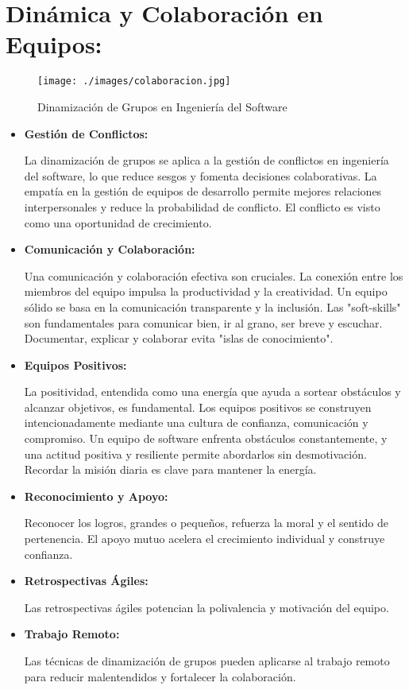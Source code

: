 \documentclass[a4paper,12pt,twoside]{article}
\begin{document}
 

\section{Dinámica y Colaboración en Equipos:}

\begin{figure}[H]
    \centering
    \texttt{[image: ./images/colaboracion.jpg]}
    \caption{Dinamización de Grupos en Ingeniería del Software}
    \label{fig:dinamizacion}
\end{figure}

\begin{itemize}
    \item \textbf{Gestión de Conflictos:} 
    
    La dinamización de grupos se aplica a la gestión de 
    conflictos en ingeniería del software, lo que reduce sesgos y fomenta decisiones colaborativas. 
    La empatía en la gestión de equipos de desarrollo permite mejores relaciones interpersonales y 
    reduce la probabilidad de conflicto. El conflicto es visto como una oportunidad de crecimiento.

    \item \textbf{Comunicación y Colaboración:} 
    
    Una comunicación y colaboración efectiva son 
    cruciales. La conexión entre los miembros del equipo impulsa la productividad y la creatividad.
    Un equipo sólido se basa en la comunicación transparente y la inclusión. Las "soft-skills" son fundamentales para comunicar bien, ir al grano, ser breve y escuchar. Documentar, explicar y colaborar evita "islas de conocimiento".

    \item \textbf{Equipos Positivos:} 
    
    La positividad, entendida como una energía que ayuda a sortear obstáculos y alcanzar objetivos, 
    es fundamental. Los equipos positivos se construyen intencionadamente mediante una cultura de 
    confianza, comunicación y compromiso. Un equipo de software enfrenta obstáculos constantemente, 
    y una actitud positiva y resiliente permite abordarlos sin desmotivación. Recordar la misión 
    diaria es clave para mantener la energía.

    \item \textbf{Reconocimiento y Apoyo:} 
    
    Reconocer los logros, grandes o pequeños, refuerza la 
    moral y el sentido de pertenencia. El apoyo mutuo acelera el crecimiento individual y construye 
    confianza.

    \item \textbf{Retrospectivas Ágiles:} 
    
    Las retrospectivas ágiles potencian la polivalencia y motivación del equipo.

    \item \textbf{Trabajo Remoto:} 
    
    Las técnicas de dinamización de grupos pueden aplicarse al trabajo remoto para reducir 
    malentendidos y fortalecer la colaboración.

\end{itemize}
\end{document}
